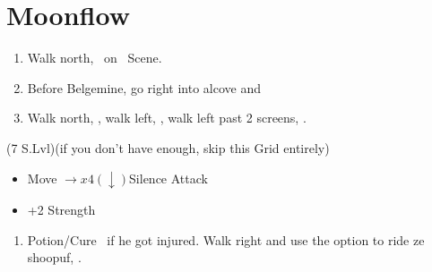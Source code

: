\chapter{Moonflow}

\begin{enumerate}
	\item Walk north, \sd\ on \kimahri\ Scene.
	\item Before Belgemine, go right into alcove and 
	\item Walk north, \sd, walk left, \sd, walk left past 2 screens, \sd.
\end{enumerate}
\begin{spheregrid}
	\begin{itemize}
		\wakkaf (7 S.Lvl)(if you don't have enough, skip this Grid entirely)
		\begin{itemize}
			\item Move $\rightarrow x4 (\downarrow)$Silence Attack
			\item +2 Strength
		\end{itemize}
	\end{itemize}
\end{spheregrid}
\begin{enumerate}[resume]
	\item Potion/Cure \tidus\ if he got injured. Walk right and use the  option to ride ze shoopuf, \sd.
\end{enumerate}

